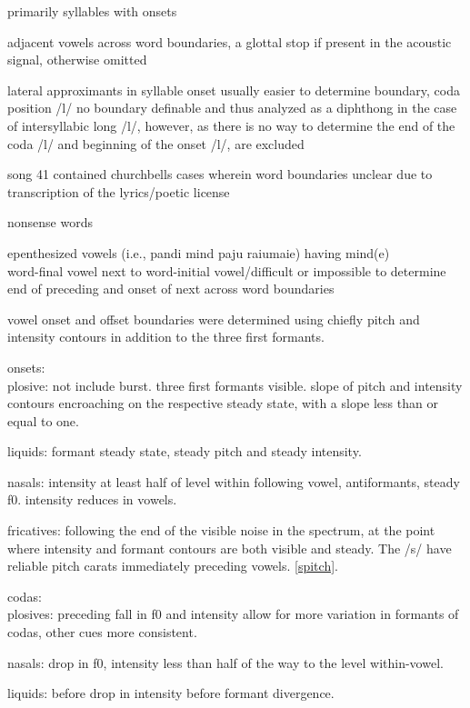 primarily syllables with onsets

adjacent vowels across word boundaries, a glottal stop if present in the acoustic signal, otherwise omitted

lateral approximants in syllable onset usually easier to determine boundary, coda position /l/ no boundary definable and thus analyzed as a diphthong
in the case of intersyllabic long /l/, however, as there is no way to determine the end of the coda /l/ and beginning of the onset /l/, are excluded

song 41 contained churchbells
cases wherein word boundaries unclear due to transcription of the lyrics/poetic license

nonsense words

epenthesized vowels (i.e., pandi mind paju raiumaie) having mind(e) \\
word-final vowel next to word-initial vowel/difficult or impossible to determine end of preceding and onset of next across word boundaries


vowel onset and offset boundaries were determined using chiefly pitch and intensity contours in addition to the three first formants.



onsets: \\

plosive: not include burst. three first formants visible. slope of pitch and intensity contours encroaching on the respective steady state, with a slope less than or equal to one. 

liquids: formant steady state, steady pitch and steady intensity. 

nasals: intensity at least half of level within following vowel, antiformants, steady f0. intensity reduces in vowels. 

fricatives: following the end of the visible noise in the spectrum, at the point where intensity and formant contours are both visible and steady. The /s/  have reliable pitch carats immediately preceding vowels. \ref{spitch}. 

codas: \\

plosives: preceding fall in f0 and intensity
allow for more variation in formants of codas, other cues more consistent.

nasals: drop in f0, intensity less than half of the way to the level within-vowel. 

liquids: before drop in intensity 
before formant divergence.

